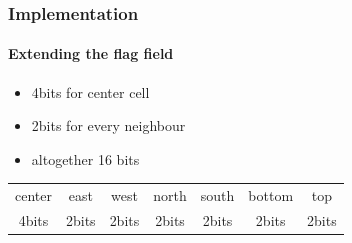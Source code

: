 \documentclass{beamer}
\begin{document}
\begin{frame}
\frametitle{Implementation}
\framesubtitle{Extending the flag field}
\begin{itemize}
\item 4bits for center cell
\item 2bits for every neighbour
\item altogether 16 bits
\end{itemize}
\begin{table}[hb!]
\label{tab4}
\centering
\begin{tabular}{|c||c|c|c|c|c|c|}
\hline
center & east & west & north & south & bottom & top \\ 
4bits & 2bits & 2bits & 2bits & 2bits & 2bits & 2bits\\
\hline
\end{tabular}
\end{table} 
\end{frame}
\end{document}
